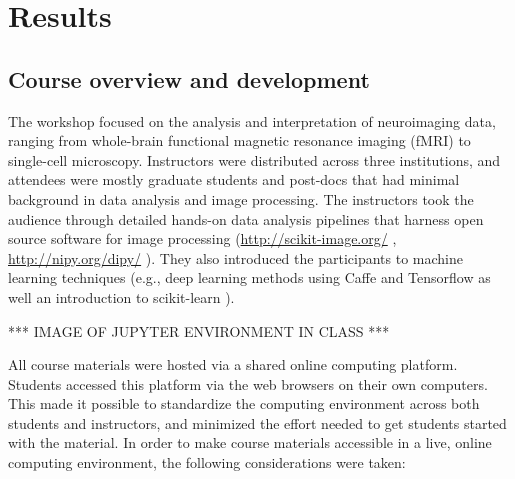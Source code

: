 \section{Results}

\subsection{Course overview and development}

The workshop focused on the analysis and interpretation of neuroimaging data,
ranging from whole-brain functional magnetic resonance imaging (fMRI) to
single-cell microscopy. Instructors were distributed across three institutions,
and attendees were mostly graduate students and post-docs that had minimal
background in data analysis and image processing. The instructors took the
audience through detailed hands-on data analysis pipelines that harness open
source software for image processing  (\url{http://scikit-image.org/}
\cite{van2014scikit}, \url{http://nipy.org/dipy/}
\cite{Garyfallidis2014FrontNeuroinf}). They also introduced the participants to
machine learning techniques (e.g., deep learning methods using Caffe
\cite{jia2014caffe} and Tensorflow \cite{abadi2016tensorflow} as well an
introduction to scikit-learn \cite{Pedregosa2012-dm}).

*** IMAGE OF JUPYTER ENVIRONMENT IN CLASS ***

All course materials were hosted via a shared online computing platform.
Students accessed this platform via the web browsers on their own computers.
This made it possible to standardize the computing environment across both
students and instructors, and minimized the effort needed to get students
started with the material. In order to make course materials accessible in a
live, online computing environment, the following considerations were taken:

